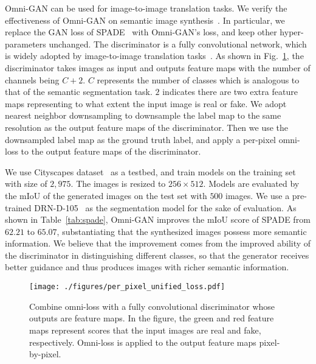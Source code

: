 \documentclass[paper_2425.tex]{subfiles}
\begin{document}
Omni-GAN can be used for image-to-image translation tasks. We verify the effectiveness of Omni-GAN on semantic image synthesis~\cite{wang2018VideotoVideo,qi2018Semiparametric}. In particular, we replace the GAN loss of SPADE~\cite{park2019Semantic} with Omni-GAN's loss, and keep other hyper-parameters unchanged.
The discriminator is a fully convolutional network, which is widely adopted by image-to-image translation tasks~\cite{park2019Semantic,isola2017ImagetoImage,wang2018HighResolution}. As shown in Fig.~\ref{apx:fig:per_pixel_omni_loss}, the discriminator takes images as input and outputs feature maps with the number of channels being $C+2$. $C$ represents the number of classes which is analogous to that of the semantic segmentation task. $2$ indicates there are two extra feature maps representing to what extent the input image is real or fake. We adopt nearest neighbor downsampling to downsample the label map to the same resolution as the output feature maps of the discriminator. Then we use the downsampled label map as the ground truth label, and apply a per-pixel omni-loss to the output feature maps of the discriminator.

We use Cityscapes dataset~\cite{cordts2016Cityscapes} as a testbed, and train models on the training set with size of $2,975$. The images is resized to $256\times512$. Models are evaluated by the mIoU of the generated images on the test set with $500$ images. We use a pre-trained DRN-D-105~\cite{yu2017Dilated} as the segmentation model for the sake of evaluation. As shown in Table~\ref{tab:spade}, Omni-GAN improves the mIoU score of SPADE from $62.21$ to $65.07$, substantiating that the synthesized images possess more semantic information. We believe that the improvement comes from the improved ability of the discriminator in distinguishing different classes, so that the generator receives better guidance and thus produces images with richer semantic information.

\begin{figure}[t]
  \begin{center}
\texttt{[image: ./figures/per\_pixel\_unified\_loss.pdf]}
  \end{center}
  \vspace{-0.5cm}
  \caption{Combine omni-loss with a fully convolutional discriminator whose outputs are feature maps. In the figure, the green and red feature maps represent scores that the input images are real and fake, respectively. Omni-loss is applied to the output feature maps pixel-by-pixel. }
  \label{apx:fig:per_pixel_omni_loss}
\end{figure}
\end{document}

